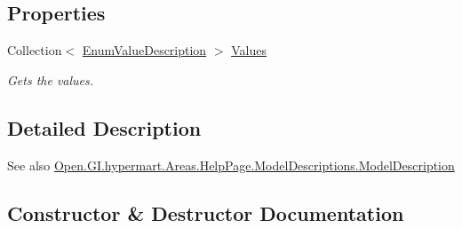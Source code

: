 \subsection*{Properties}
\begin{DoxyCompactItemize}
\item 
Collection$<$ \hyperlink{class_open_1_1_g_i_1_1hypermart_1_1_areas_1_1_help_page_1_1_model_descriptions_1_1_enum_value_description}{Enum\+Value\+Description} $>$ \hyperlink{class_open_1_1_g_i_1_1hypermart_1_1_areas_1_1_help_page_1_1_model_descriptions_1_1_enum_type_model_description_a7b42c1652865a638dd214ba6a1642819}{Values}
\begin{DoxyCompactList}\small\item\em Gets the values. \end{DoxyCompactList}\end{DoxyCompactItemize}


\subsection{Detailed Description}


\begin{DoxySeeAlso}{See also}
\hyperlink{class_open_1_1_g_i_1_1hypermart_1_1_areas_1_1_help_page_1_1_model_descriptions_1_1_model_description}{Open.\+G\+I.\+hypermart.\+Areas.\+Help\+Page.\+Model\+Descriptions.\+Model\+Description}


\end{DoxySeeAlso}


\subsection{Constructor \& Destructor Documentation}
\hypertarget{class_open_1_1_g_i_1_1hypermart_1_1_areas_1_1_help_page_1_1_model_descriptions_1_1_enum_type_model_description_a77a337dadd9fdcee12869c7385bf51dc}{}\label{class_open_1_1_g_i_1_1hypermart_1_1_areas_1_1_help_page_1_1_model_descriptions_1_1_enum_type_model_description_a77a337dadd9fdcee12869c7385bf51dc} 
